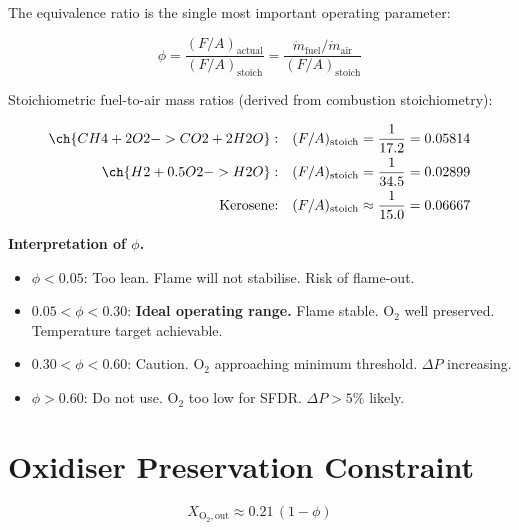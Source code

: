 \documentclass[12pt,a4paper]{report}
\begin{document}
The equivalence ratio is the single most important operating parameter:

\begin{formulabox}
\begin{equation}
  \phi = \frac{(F/A)_\text{actual}}{(F/A)_\text{stoich}}
  = \frac{\dot{m}_\text{fuel}/\dot{m}_\text{air}}{(F/A)_\text{stoich}}
  \label{eq:phi}
\end{equation}
\end{formulabox}

\noindent Stoichiometric fuel-to-air mass ratios (derived from combustion
stoichiometry):

\begin{align}
  \ch{CH4 + 2O2 -> CO2 + 2H2O}:&\quad (F/A)_\text{stoich} = \frac{1}{17.2} = 0.05814
  \label{eq:stoich_ch4}\\
  \ch{H2 + 0.5O2 -> H2O}:       &\quad (F/A)_\text{stoich} = \frac{1}{34.5} = 0.02899\\
  \text{Kerosene:}               &\quad (F/A)_\text{stoich} \approx \frac{1}{15.0} = 0.06667
\end{align}

\begin{infobox}
\textbf{Interpretation of $\phi$.}
\begin{itemize}[leftmargin=1.2em, itemsep=2pt]
  \item $\phi < 0.05$: Too lean. Flame will not stabilise. Risk of flame-out.
  \item $0.05 < \phi < 0.30$: \textbf{Ideal operating range.}
        Flame stable. O$_2$ well preserved. Temperature target achievable.
  \item $0.30 < \phi < 0.60$: Caution. O$_2$ approaching minimum threshold.
        $\Delta P$ increasing.
  \item $\phi > 0.60$: Do not use. O$_2$ too low for SFDR. $\Delta P > 5\%$ likely.
\end{itemize}
\end{infobox}

\section{Oxidiser Preservation Constraint}

\begin{formulabox}
\begin{equation}
  X_{\text{O}_2,\text{out}} \approx 0.21\,(1-\phi)
  \label{eq:o2}
\end{equation}
\end{formulabox}
\end{document}
